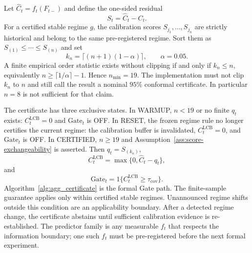 \documentclass[letterpaper,journal]{IEEEtran}
\begin{document}
Let $\widehat C_t=f_t(F_{t-})$ and define the one-sided residual
\begin{equation}
 S_t=\widehat C_t-C_t.
 \label{eq:agg_St}
\end{equation}
For a certified stable regime $g$, the calibration scores
$S_{j_1},\ldots,S_{j_n}$ are strictly historical and belong to the same
pre-registered regime.  Sort them as $S_{(1)}\le\cdots\le S_{(n)}$ and set
\begin{equation}
 k_n=\lceil(n+1)(1-\alpha)\rceil,
 \qquad
 \alpha=0.05.
 \label{eq:agg_kn}
\end{equation}
A finite empirical order statistic exists without clipping if and only if
$k_n\le n$, equivalently $n\ge\lceil 1/\alpha\rceil-1$.  Hence
$n_{\min}=19$.  The implementation must not clip $k_n$ to $n$ and still call
the result a nominal $95\%$ conformal certificate.  In particular $n=8$ is
not sufficient for that claim.

The certificate has three exclusive states.  In WARMUP, $n<19$ or no
finite $q_t$ exists: $C^{\mathrm{LCB}}_t=0$ and $\mathrm{Gate}_t$ is OFF.
In RESET, the frozen regime rule no longer certifies the current regime: the
calibration buffer is invalidated, $C^{\mathrm{LCB}}_t=0$, and
$\mathrm{Gate}_t$ is OFF.  In CERTIFIED, $n\ge 19$ and Assumption~\ref{ass:score-exchangeability}
is asserted.  Then $q_t=S_{(k_n)}$,
\begin{equation}
 C^{\mathrm{LCB}}_t=\max\{0,\widehat C_t-q_t\},
 \label{eq:agg_CLCB}
\end{equation}
and
\begin{equation}
 \mathrm{Gate}_t=1\{C^{\mathrm{LCB}}_t\ge\tau_{\mathrm{cov}}\}.
 \label{eq:agg_Gate}
\end{equation}
Algorithm~\ref{alg:agg_certificate} is the formal Gate path.  The finite-sample
guarantee applies only within certified stable regimes.  Unannounced regime
shifts outside this condition are an applicability boundary.  After a detected
regime change, the certificate abstains until sufficient calibration evidence
is re-established.  The predictor family is any measurable $f_t$ that respects
the information boundary; one such $f_t$ must be pre-registered before the next
formal experiment.
\end{document}
